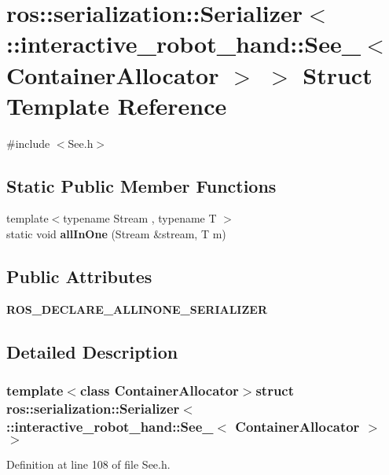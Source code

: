 \section{ros\-:\-:serialization\-:\-:Serializer$<$ \-:\-:interactive\-\_\-robot\-\_\-hand\-:\-:See\-\_\-$<$ Container\-Allocator $>$ $>$ Struct Template Reference}
\label{structros_1_1serialization_1_1Serializer_3_01_1_1interactive__robot__hand_1_1See___3_01ContainerAllocator_01_4_01_4}


{\ttfamily \#include $<$See.\-h$>$}

\subsection*{Static Public Member Functions}
\begin{DoxyCompactItemize}
\item 
{\footnotesize template$<$typename Stream , typename T $>$ }\\static void {\bf all\-In\-One} (Stream \&stream, T m)
\end{DoxyCompactItemize}
\subsection*{Public Attributes}
\begin{DoxyCompactItemize}
\item 
{\bf R\-O\-S\-\_\-\-D\-E\-C\-L\-A\-R\-E\-\_\-\-A\-L\-L\-I\-N\-O\-N\-E\-\_\-\-S\-E\-R\-I\-A\-L\-I\-Z\-E\-R}
\end{DoxyCompactItemize}


\subsection{Detailed Description}
\subsubsection*{template$<$class Container\-Allocator$>$struct ros\-::serialization\-::\-Serializer$<$ \-::interactive\-\_\-robot\-\_\-hand\-::\-See\-\_\-$<$ Container\-Allocator $>$ $>$}



Definition at line 108 of file See.\-h.



